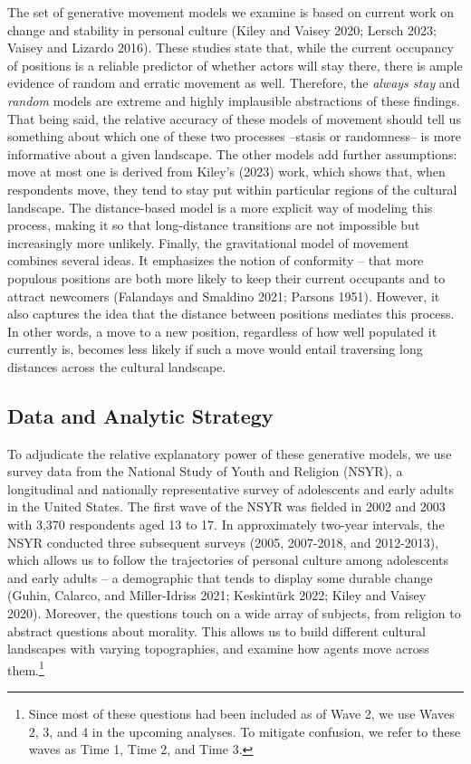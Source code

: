 \documentclass[
  11pt,
]{article}
\begin{document}
The set of generative movement models we examine is based on current
work on change and stability in personal culture (Kiley and Vaisey 2020;
Lersch 2023; Vaisey and Lizardo 2016). These studies state that, while
the current occupancy of positions is a reliable predictor of whether
actors will stay there, there is ample evidence of random and erratic
movement as well. Therefore, the \emph{always stay} and \emph{random}
models are extreme and highly implausible abstractions of these
findings. That being said, the relative accuracy of these models of
movement should tell us something about which one of these two processes
--stasis or randomness-- is more informative about a given landscape.
The other models add further assumptions: move at most one is derived
from Kiley's (2023) work, which shows that, when respondents move, they
tend to stay put within particular regions of the cultural landscape.
The distance-based model is a more explicit way of modeling this
process, making it so that long-distance transitions are not impossible
but increasingly more unlikely. Finally, the gravitational model of
movement combines several ideas. It emphasizes the notion of conformity
-- that more populous positions are both more likely to keep their
current occupants and to attract newcomers (Falandays and Smaldino 2021;
Parsons 1951). However, it also captures the idea that the distance
between positions mediates this process. In other words, a move to a new
position, regardless of how well populated it currently is, becomes less
likely if such a move would entail traversing long distances across the
cultural landscape.

\hypertarget{data-and-analytic-strategy}{%
\subsection{Data and Analytic
Strategy}\label{data-and-analytic-strategy}}

To adjudicate the relative explanatory power of these generative models,
we use survey data from the National Study of Youth and Religion (NSYR),
a longitudinal and nationally representative survey of adolescents and
early adults in the United States. The first wave of the NSYR was
fielded in 2002 and 2003 with 3,370 respondents aged 13 to 17. In
approximately two-year intervals, the NSYR conducted three subsequent
surveys (2005, 2007-2018, and 2012-2013), which allows us to follow the
trajectories of personal culture among adolescents and early adults -- a
demographic that tends to display some durable change (Guhin, Calarco,
and Miller-Idriss 2021; Keskintürk 2022; Kiley and Vaisey 2020).
Moreover, the questions touch on a wide array of subjects, from religion
to abstract questions about morality. This allows us to build different
cultural landscapes with varying topographies, and examine how agents
move across them.\footnote{Since most of these questions had been
  included as of Wave 2, we use Waves 2, 3, and 4 in the upcoming
  analyses. To mitigate confusion, we refer to these waves as Time 1,
  Time 2, and Time 3.}
\end{document}
